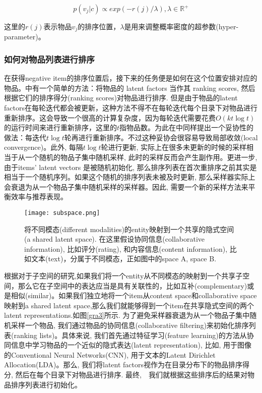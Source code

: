 \begin{equation}
p\left(v_j|c\right) \propto exp\left(-r\left(j\right)/\lambda\right),\lambda \in \mathbb{R}^+
\end{equation}

这里的$r\left(j\right)$表示物品$v_j$的排序位置，$\lambda$是用来调整概率密度的超参数(hyper-parameter)。




\subsubsection{如何对物品列表进行排序}
在获得negative item的排序位置后，接下来的任务便是如何在这个位置安排对应的物品。\cite{rendle2014improving}中有一个简单的方法：将物品的 latent factors 当作其 ranking scores, 然后根据它们的排序得分(ranking scores)对物品进行排序. 但是由于物品的latent factors在每轮迭代都会被更新，这种方法不得不在每轮迭代每个目录下对物品进行重新排序。这会导致一个很高的计算复杂度，因为每轮迭代需要花费$\mathit{O}\left(kt\log t\right)$的运行时间来进行重新排序，这里的$t$指物品数。为此在\cite{rendle2014improving}中同样提出一个妥协性的做法：每迭代$t \log t$轮再进行重新排序。不过这种妥协会很容易导致局部收敛(local convergence)。此外, 每隔$t\log t$轮进行更新, 实际上在很多未更新的时候的采样相当于从一个随机的物品子集中随机采样, 此时的采样反而会产生副作用。更进一步, 由于items' latent vectors 是被随机初始化, 那么排序列表在首次重排序之前其实是相当于一个随机序列。如果这个随机的排序列表未被及时更新, 那么采样器实际上会衰退为从一个物品子集中随机采样的采样器。因此, 需要一个新的采样方法来平衡效率与推荐表现。

\begin{figure}[htbp]
	\begin{center}
		\texttt{[image: subspace.png]}
		\caption{将不同模态(different modalities)的entity映射到一个共享的隐式空间(a shared latent space). 在这里假设协同信息(collaborative information), 比如评分(rating), 和内容信息(content information), 比如文本(text)，分属于不同模态，正如图中的space A, space B.}
		\label{gra5}
	\end{center}
\end{figure}

根据对于子空间的研究\cite{udupa2010improving,rasiwasia2010new},如果我们将一个entity从不同模态的映射到一个共享子空间，那么它在子空间中的表达应当是具有关联性的，比如互补(complementary)或是相似(similar)。如果我们独立地将一个item从content space和collaborative space映射到a shared latent space,那么我们就能够得到一个item在共享隐式空间的两个latent representations.如图\ref{gra3}所示. 为了避免采样器衰退为从一个物品子集中随机采样一个物品, 我们通过物品的协同信息(collaborative filtering)来初始化排序列表(ranking lists)。具体来说, 我们首先通过特征学习(feature learning)的方法从协同信息中学习物品的一个近似的隐式表达(latent representation), 比如, 用于图像的Conventional Neural Networks(CNN), 用于文本的Latent Dirichlet Allocation(LDA)。那么, 我们将latent factors视作为在目录分布下的物品排序得分, 然后在每个目录下对物品进行排序. 最终,　我们就根据这些排序后的结果对物品排序列表进行初始化。

